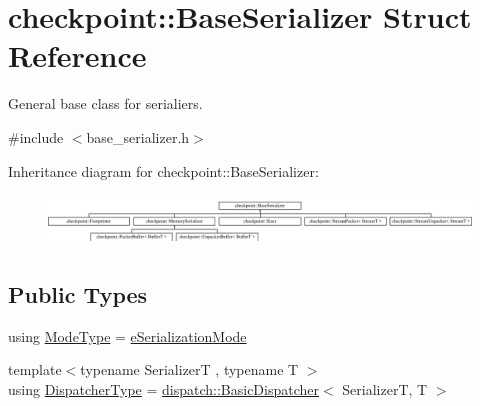 \hypertarget{structcheckpoint_1_1_base_serializer}{}\section{checkpoint\+:\+:Base\+Serializer Struct Reference}
\label{structcheckpoint_1_1_base_serializer}


General base class for serialiers.  




{\ttfamily \#include $<$base\+\_\+serializer.\+h$>$}

Inheritance diagram for checkpoint\+:\+:Base\+Serializer\+:\begin{figure}[H]
\begin{center}
\leavevmode
\includegraphics[height=1.344000cm]{structcheckpoint_1_1_base_serializer}
\end{center}
\end{figure}
\subsection*{Public Types}
\begin{DoxyCompactItemize}
\item 
using \hyperlink{structcheckpoint_1_1_base_serializer_aaa856a02f204d9c3892810b87671b3e9}{Mode\+Type} = \hyperlink{namespacecheckpoint_ae2509499ccd8b1dc48fb535bf8aa3059}{e\+Serialization\+Mode}
\item 
{\footnotesize template$<$typename SerializerT , typename T $>$ }\\using \hyperlink{structcheckpoint_1_1_base_serializer_a6e98a837a89de1750749e4ef8742489c}{Dispatcher\+Type} = \hyperlink{structcheckpoint_1_1dispatch_1_1_basic_dispatcher}{dispatch\+::\+Basic\+Dispatcher}$<$ SerializerT, T $>$
\end{DoxyCompactItemize}
